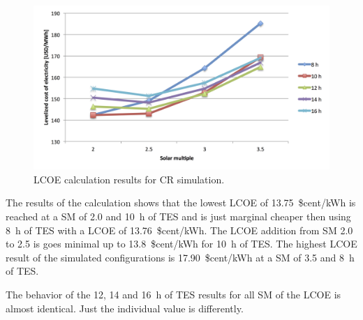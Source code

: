 \begin{figure}[htbp]  
\centering
\includegraphics[width=1\linewidth]{FIG/CR_LCOE}
\caption[LCOE calculation results for CR simulation.]{LCOE calculation results for CR simulation.}\label{CR_LCOE}
\end{figure}
The results of the calculation shows that the lowest LCOE of 13.75~\$cent/kWh is reached at a SM of 2.0 and 10~h of TES and is just  marginal cheaper then using 8~h of TES with a LCOE of 13.76~\$cent/kWh. The LCOE addition from SM 2.0 to 2.5 is goes minimal up to 13.8~\$cent/kWh for 10~h of TES. The highest LCOE result of the simulated configurations is 17.90~\$cent/kWh at a SM of 3.5 and 8~h of TES. 

The behavior of the 12, 14 and 16~h of TES results for all SM of the LCOE is almost identical. Just the individual value is differently.


